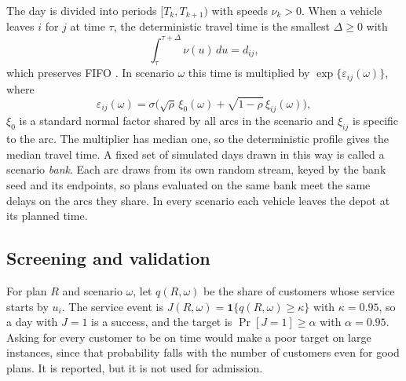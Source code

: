 \documentclass{itor}
\begin{document}
The day is divided into periods $[T_k,T_{k+1})$ with speeds $\nu_k>0$. When a
vehicle leaves $i$ for $j$ at time $\tau$, the deterministic travel time is the
smallest $\Delta\geq0$ with
\begin{equation}
 \int_{\tau}^{\tau+\Delta}\nu(u)\,du=d_{ij},                 \label{eq:fifo}
\end{equation}
which preserves FIFO \citep{ichoua2003}. In scenario $\omega$ this time is
multiplied by $\exp\{\varepsilon_{ij}(\omega)\}$, where
\begin{equation}
 \varepsilon_{ij}(\omega)=\sigma\bigl(\sqrt{\rho}\,\xi_0(\omega)
 +\sqrt{1-\rho}\,\xi_{ij}(\omega)\bigr),                       \label{eq:noise}
\end{equation}
$\xi_0$ is a standard normal factor shared by all arcs in the scenario and
$\xi_{ij}$ is specific to the arc. The multiplier has median one, so the
deterministic profile gives the median travel time. A fixed set of simulated
days drawn in this way is called a scenario \emph{bank}. Each arc draws from its
own random stream, keyed by the bank seed and its endpoints, so plans evaluated
on the same bank meet the same delays on the arcs they share. In every scenario
each vehicle leaves the depot at its planned time.

\subsection{Screening and validation}

For plan $R$ and scenario $\omega$, let $q(R,\omega)$ be the share of customers
whose service starts by $u_i$. The service event is
$J(R,\omega)=\mathbf{1}\{q(R,\omega)\geq\kappa\}$ with $\kappa=0.95$, so a
day with $J=1$ is a success, and the target is $\Pr[J=1]\geq\alpha$ with
$\alpha=0.95$.
Asking for every customer to be on time would make a poor target on large
instances, since that probability falls with the number of customers even for
good plans. It is reported, but it is not used for admission.
\end{document}
